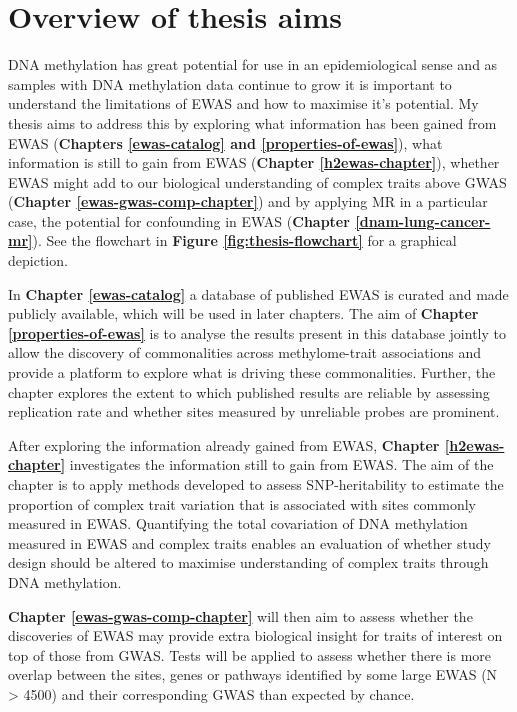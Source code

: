 \documentclass[11pt,twoside]{bristolthesis}
\begin{document}
\hypertarget{overview-of-thesis-aims}{%
\section{Overview of thesis aims}\label{overview-of-thesis-aims}}

DNA methylation has great potential for use in an epidemiological sense and as samples with DNA methylation data continue to grow it is important to understand the limitations of EWAS and how to maximise it's potential. My thesis aims to address this by exploring what information has been gained from EWAS (\textbf{Chapters \ref{ewas-catalog} and \ref{properties-of-ewas}}), what information is still to gain from EWAS (\textbf{Chapter \ref{h2ewas-chapter}}), whether EWAS might add to our biological understanding of complex traits above GWAS (\textbf{Chapter \ref{ewas-gwas-comp-chapter}}) and by applying MR in a particular case, the potential for confounding in EWAS (\textbf{Chapter \ref{dnam-lung-cancer-mr}}). See the flowchart in \textbf{Figure \ref{fig:thesis-flowchart}} for a graphical depiction.

In \textbf{Chapter \ref{ewas-catalog}} a database of published EWAS is curated and made publicly available, which will be used in later chapters. The aim of \textbf{Chapter \ref{properties-of-ewas}} is to analyse the results present in this database jointly to allow the discovery of commonalities across methylome-trait associations and provide a platform to explore what is driving these commonalities. Further, the chapter explores the extent to which published results are reliable by assessing replication rate and whether sites measured by unreliable probes are prominent.

After exploring the information already gained from EWAS, \textbf{Chapter \ref{h2ewas-chapter}} investigates the information still to gain from EWAS. The aim of the chapter is to apply methods developed to assess SNP-heritability to estimate the proportion of complex trait variation that is associated with sites commonly measured in EWAS. Quantifying the total covariation of DNA methylation measured in EWAS and complex traits enables an evaluation of whether study design should be altered to maximise understanding of complex traits through DNA methylation.

\textbf{Chapter \ref{ewas-gwas-comp-chapter}} will then aim to assess whether the discoveries of EWAS may provide extra biological insight for traits of interest on top of those from GWAS. Tests will be applied to assess whether there is more overlap between the sites, genes or pathways identified by some large EWAS (N \textgreater{} 4500) and their corresponding GWAS than expected by chance.
\end{document}
